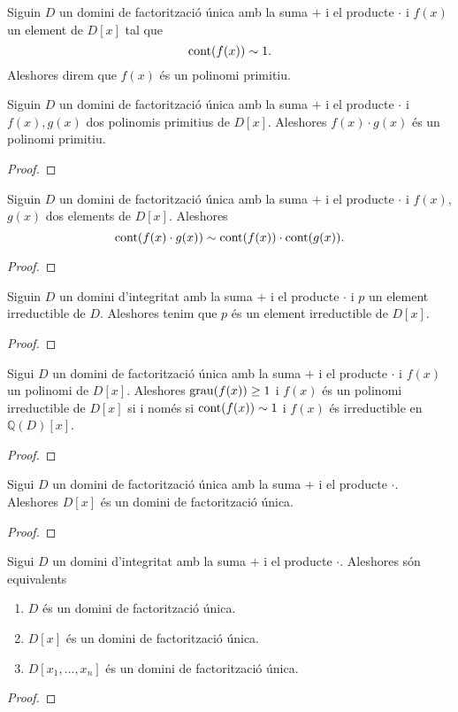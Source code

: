 \documentclass[../Apunts.tex]{subfiles}
\begin{document}
	\begin{definition}
		Siguin \(D\) un domini de factorització única amb la suma \(+\) i el producte \(\cdot\) i \(f(x)\) un element de \(D[x]\) tal que
		\[\operatorname{cont}(f(x))\sim1.\]
		Aleshores direm que \(f(x)\) és un polinomi primitiu.
	\end{definition}
	\begin{lemma}
		\label{lema:lema de Gauss}
		Siguin \(D\) un domini de factorització única amb la suma \(+\) i el producte \(\cdot\) i \(f(x),g(x)\) dos polinomis primitius de \(D[x]\). Aleshores \(f(x)\cdot g(x)\) és un polinomi primitiu.
		\begin{proof}
		\end{proof}
	\end{lemma}
	\begin{corollary}
		Siguin \(D\) un domini de factorització única amb la suma \(+\) i el producte \(\cdot\) i \(f(x)\), \(g(x)\) dos elements de \(D[x]\). Aleshores
		\[\operatorname{cont}(f(x)\cdot g(x))\sim\operatorname{cont}(f(x))\cdot\operatorname{cont}(g(x)).\]
		\begin{proof}
		\end{proof}
	\end{corollary}
	\begin{lemma}
		Siguin \(D\) un domini d'integritat amb la suma \(+\) i el producte \(\cdot\) i \(p\) un element irreductible de \(D\). Aleshores tenim que \(p\) és un element irreductible de \(D[x]\).
		\begin{proof}
		\end{proof}
	\end{lemma}
	\begin{theorem}
		Sigui \(D\) un domini de factorització única amb la suma \(+\) i el producte \(\cdot\) i \(f(x)\) un polinomi de \(D[x]\). Aleshores \(\operatorname{grau}(f(x))\geq1\) i \(f(x)\) és un polinomi irreductible de \(D[x]\) si i només si \(\operatorname{cont}(f(x))\sim1\) i \(f(x)\) és irreductible en \(\mathbb{Q}(D)[x]\).
		\begin{proof}
		\end{proof}
	\end{theorem}
	\begin{theorem}
		Sigui \(D\) un domini de factorització única amb la suma \(+\) i el producte \(\cdot\). Aleshores \(D[x]\) és un domini de factorització única.
		\begin{proof}
		\end{proof}
	\end{theorem}
	\begin{theorem}
		Sigui \(D\) un domini d'integritat amb la suma \(+\) i el producte \(\cdot\). Aleshores són equivalents
		\begin{enumerate}
			\item \(D\) és un domini de factorització única.
			\item \(D[x]\) és un domini de factorització única.
			\item \(D[x_{1},\dots,x_{n}]\) és un domini de factorització única.
		\end{enumerate}
		\begin{proof}
		\end{proof}
	\end{theorem}
\end{document}
